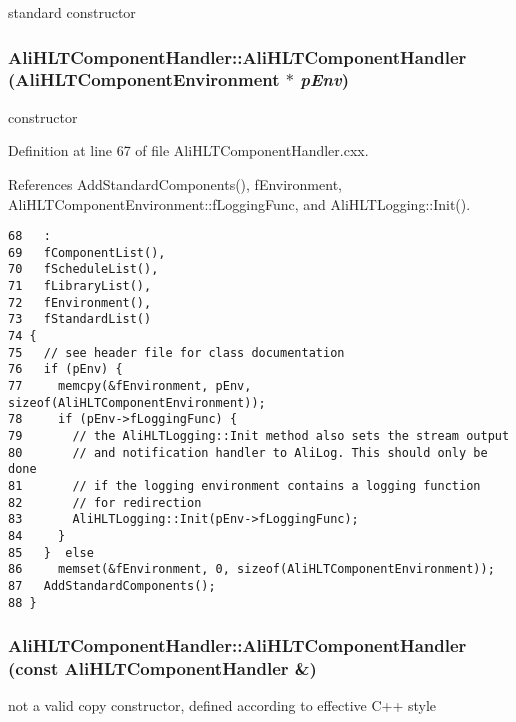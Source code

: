 standard constructor 
\subsubsection{\setlength{\rightskip}{0pt plus 5cm}Ali\-HLTComponent\-Handler::Ali\-HLTComponent\-Handler ({\bf Ali\-HLTComponent\-Environment} $\ast$ {\em p\-Env})}\label{classAliHLTComponentHandler_a1}


constructor 

Definition at line 67 of file Ali\-HLTComponent\-Handler.cxx.

References Add\-Standard\-Components(), f\-Environment, Ali\-HLTComponent\-Environment::f\-Logging\-Func, and Ali\-HLTLogging::Init().

\footnotesize\begin{verbatim}68   :
69   fComponentList(),
70   fScheduleList(),
71   fLibraryList(),
72   fEnvironment(),
73   fStandardList()
74 {
75   // see header file for class documentation
76   if (pEnv) {
77     memcpy(&fEnvironment, pEnv, sizeof(AliHLTComponentEnvironment));
78     if (pEnv->fLoggingFunc) {
79       // the AliHLTLogging::Init method also sets the stream output
80       // and notification handler to AliLog. This should only be done
81       // if the logging environment contains a logging function
82       // for redirection
83       AliHLTLogging::Init(pEnv->fLoggingFunc);
84     }
85   }  else
86     memset(&fEnvironment, 0, sizeof(AliHLTComponentEnvironment));
87   AddStandardComponents();
88 }

\end{verbatim}\normalsize 


\subsubsection{\setlength{\rightskip}{0pt plus 5cm}Ali\-HLTComponent\-Handler::Ali\-HLTComponent\-Handler (const {\bf Ali\-HLTComponent\-Handler} \&)}\label{classAliHLTComponentHandler_a2}


not a valid copy constructor, defined according to effective C++ style 

